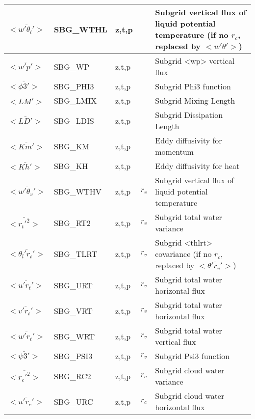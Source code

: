 \begin{longtable}[c]{|p{}|p{}|p{}|p{}|p{}|}
$<\overline{w'\theta_l'}>$                   & SBG\_WTHL & z,t,p   &        & Subgrid vertical flux of liquid potential temperature (if no $r_c$, replaced by $<\overline{w'\theta'}>$) \\\hline
$<\overline{w'p'}>$                          & SBG\_WP   & z,t,p   &        & Subgrid <wp> vertical flux \\\hline
$<\overline{\phi3'}>$                        & SBG\_PHI3 & z,t,p   &        & Subgrid Phi3 function \\\hline
$<\overline{LM'}>$                           & SBG\_LMIX & z,t,p   &        & Subgrid Mixing Length \\\hline
$<\overline{LD'}>$                           & SBG\_LDIS & z,t,p   &        & Subgrid Dissipation Length \\\hline
$<\overline{Km'}>$                           & SBG\_KM   & z,t,p   &        & Eddy diffusivity for momentum \\\hline
$<\overline{Kh'}>$                           & SBG\_KH   & z,t,p   &        & Eddy diffusivity for heat \\\hline
$<\overline{w'\theta_v'}>$                   & SBG\_WTHV & z,t,p   & $r_v$  & Subgrid vertical flux of liquid potential temperature \\\hline
$<\overline{r_t'^2}>$                        & SBG\_RT2  & z,t,p   & $r_v$  & Subgrid total water variance \\\hline
$<\overline{\theta_l'r_t'}>$                 & SBG\_TLRT & z,t,p   & $r_v$  & Subgrid <thlrt> covariance (if no $r_c$, replaced by $<\overline{\theta'r_v'}>$) \\\hline
$<\overline{u'r_t'}>$                        & SBG\_URT  & z,t,p   & $r_v$  & Subgrid total water horizontal flux \\\hline
$<\overline{v'r_t'}>$                        & SBG\_VRT  & z,t,p   & $r_v$  & Subgrid total water horizontal flux \\\hline
$<\overline{w'r_t'}>$                        & SBG\_WRT  & z,t,p   & $r_v$  & Subgrid total water vertical flux \\\hline
$<\overline{\psi3'}>$                        & SBG\_PSI3 & z,t,p   & $r_v$  & Subgrid Psi3 function \\\hline
$<\overline{r_c'^2}>$                        & SBG\_RC2  & z,t,p   & $r_c$  & Subgrid cloud water variance \\\hline
$<\overline{u'r_c'}>$                        & SBG\_URC  & z,t,p   & $r_c$  & Subgrid cloud water horizontal flux \\\hline

\end{longtable}
